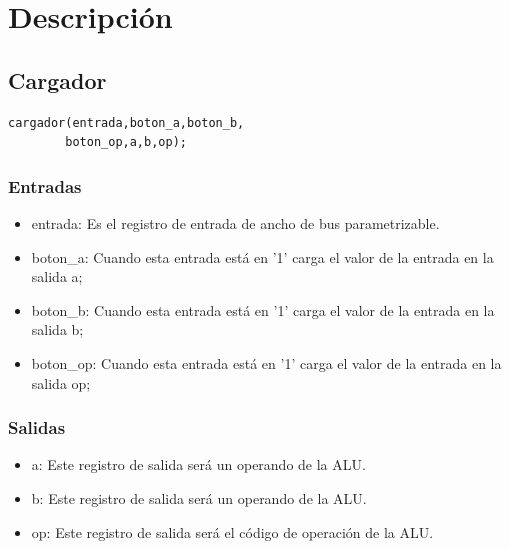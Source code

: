 \documentclass[letterpaper]{sae}
\begin{document}
\section{Descripción}
\subsection{Cargador}
\begin{verbatim}
cargador(entrada,boton_a,boton_b,
		boton_op,a,b,op);
\end{verbatim}

\begin{figure}[H] %
\label{fig:cargador}
\end{figure}

\subsubsection{Entradas}
\begin{itemize}
	\item entrada: Es el registro de entrada de ancho de bus parametrizable.
	\item boton\_a: Cuando esta entrada está en '1' carga el valor de la entrada en la salida a;
	\item boton\_b: Cuando esta entrada está en '1' carga el valor de la entrada en la salida b;
	\item boton\_op: Cuando esta entrada está en '1' carga el valor de la entrada en la salida op;
\end{itemize}
\subsubsection{Salidas}
\begin{itemize}
	\item a: Este registro de salida será un operando de la ALU.
	\item b: Este registro de salida será un operando de la ALU.
	\item op: Este registro de salida será el código de operación de la ALU. 
\end{itemize}
\end{document}
